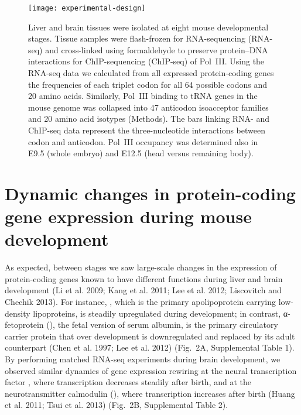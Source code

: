\begin{figure}
    \texttt{[image: experimental-design]}

    \caption{
        Liver and brain tissues were isolated at eight mouse developmental
        stages. Tissue samples were flash-frozen for RNA-sequencing (RNA-seq)
        and cross-linked using formaldehyde to preserve protein–DNA interactions
        for ChIP-sequencing (ChIP-seq) of Pol~III. Using the RNA-seq data we
        calculated from all expressed protein-coding genes the frequencies of
        each triplet codon for all 64 possible codons and 20 amino acids.
        Similarly, Pol~III binding to tRNA genes in the mouse genome was
        collapsed into 47 anticodon isoacceptor families and 20 amino acid
        isotypes (Methods). The bars linking RNA- and ChIP-seq data represent
        the three-nucleotide interactions between codon and anticodon. Pol~III
        occupancy was determined also in E9.5 (whole embryo) and E12.5 (head
        versus remaining body).\label{fig:design}}
\end{figure}

\section{Dynamic changes in protein-coding gene expression during mouse
development}


As expected, between stages we saw large-scale changes in the expression of
protein-coding genes known to have different functions during liver and brain
development (Li et al. 2009; Kang et al. 2011; Lee et al. 2012; Liscovitch and
Chechik 2013). For instance, , which is the primary apolipoprotein
carrying low-density lipoproteins, is steadily upregulated during development;
in contrast, α-fetoprotein (), the fetal version of serum albumin, is
the primary circulatory carrier protein that over development is downregulated
and replaced by its adult counterpart (Chen et al. 1997; Lee et al. 2012)
(Fig.~2A, Supplemental Table 1). By performing matched RNA-seq experiments
during brain development, we observed similar dynamics of gene expression
rewiring at the neural transcription factor , where transcription
decreases steadily after birth, and at the neurotransmitter calmodulin
(), where transcription increases after birth (Huang et al. 2011;
Tsui et al. 2013) (Fig.~2B, Supplemental Table 2).
